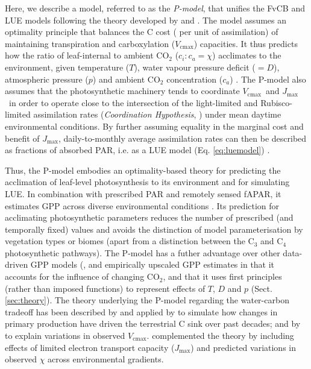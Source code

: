 \documentclass{myreport}
\newcommand{\vcmax}{$V_{\text{cmax}}$}
\newcommand{\jmax}{$J_{\text{max}}$}
\begin{document}
Here, we describe a model, referred to as the \textit{P-model}, that unifies the FvCB and LUE models following the theory developed by \citet{prentice14ecollett} and \citet{wang17natpl}. The model assumes an optimality principle that balances the C cost ( per unit of assimilation) of maintaining transpiration and carboxylation (\vcmax ) capacities. It thus predicts how the ratio of leaf-internal to ambient CO$_2$ ($c_i:c_a = \chi$) acclimates to the environment, given temperature ($T$), water vapour pressure deficit ($= D$), atmospheric pressure ($p$) and ambient CO$_2$ concentration ($c_a$)  \citep{prentice14ecollett}. The P-model also assumes that the photosynthetic machinery tends to coordinate \vcmax\ and \jmax\ in order to operate close to the intersection of the light-limited and Rubisco-limited assimilation rates (\textit{Coordination Hypothesis}, \citet{chen93, maire12po}) under mean daytime environmental conditions. %
By further assuming equality in the marginal cost and benefit of \jmax , daily-to-monthly average assimilation rates can then be described as fractions of absorbed PAR, i.e. as a LUE model (Eq. \ref{eq:luemodel}) \citep{wang17natpl}.  

Thus, the P-model embodies an optimality-based theory for predicting the acclimation of leaf-level photosynthesis to its environment and for simulating LUE. In combination with prescribed PAR and remotely sensed fAPAR, it estimates GPP across diverse environmental conditions \citep{wang17natpl}. Its prediction for acclimating photosynthetic parameters reduces the number of prescribed (and temporally fixed) values and avoids the distinction of model parameterisation by vegetation types or biomes (apart from a distinction between the C$_3$ and C$_4$ photosynthetic pathways). The P-model has a futher advantage over other data-driven GPP models (\citep{running04, Zhang2017-yr}, and empirically upscaled GPP estimates \citep{jung11jgr} in that it accounts for the influence of changing CO$_2$, and that it uses first principles (rather than imposed functions) to represent effects of $T$, $D$ and $p$ (Sect. \ref{sec:theory}). The theory underlying the P-model regarding the water-carbon tradeoff has been described by \citet{prentice14ecollett} and applied by \citet{keenan17natcomm} to simulate how changes in primary production have driven the terrestrial C sink over past decades; and by \citet{smith19ecollett} to explain variations in observed \vcmax .  \citet{wang17natpl} complemented the theory by including effects of limited electron transport capacity (\jmax ) and predicted variations in observed $\chi$ across environmental gradients. 
\end{document}

